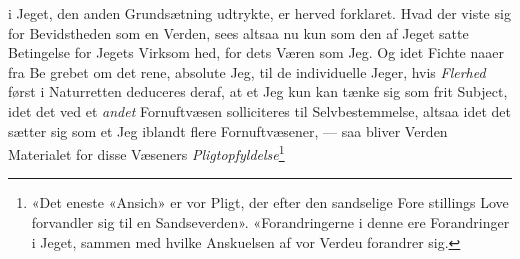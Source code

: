 \documentclass[12pt,a4paper]{book}
\begin{document}
i Jeget, den anden Grundsætning udtrykte, er herved forklaret.
Hvad der viste sig for Bevidstheden som en Verden, sees altsaa
nu kun som den af Jeget satte Betingelse for Jegets Virksom\-%
hed, for dets Væren som Jeg. Og idet Fichte naaer fra Be\-%
grebet om det rene, absolute Jeg, til de individuelle Jeger,
hvis \emph{Flerhed} først i Naturretten deduceres deraf, at et Jeg
kun kan tænke sig som frit Subject, idet det ved et \emph{andet}
Fornuftvæsen solliciteres til Selvbestemmelse, altsaa idet det
sætter sig som et Jeg iblandt flere Fornuftvæsener, --- saa bliver
Verden Materialet for disse Væseners \emph{Pligtopfyldelse}\footnote{%
«Det eneste «Ansich» er vor Pligt, der efter den sandselige Fore\-%
stillings Love forvandler sig til en Sandseverden». «Forandringerne
i denne ere Forandringer i Jeget, sammen med hvilke Anskuelsen
af vor Verdeu forandrer sig.%
%
%
}
\end{document}
